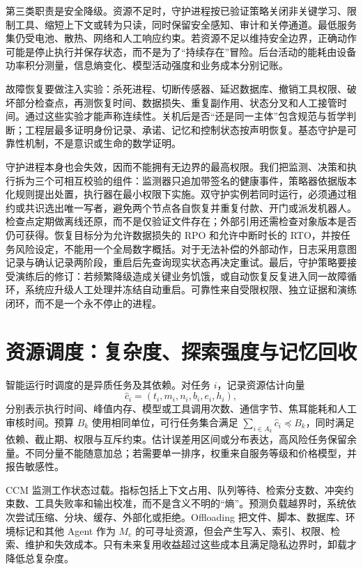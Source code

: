 第三类职责是安全降级。资源不足时，守护进程按已验证策略关闭非关键学习、限制工具、缩短上下文或转为只读，同时保留安全感知、审计和关停通道。最低服务集仍受电池、散热、网络和人工响应约束。若资源不足以维持安全边界，正确动作可能是停止执行并保存状态，而不是为了“持续存在”冒险。后台活动的能耗由设备功率积分测量，信息熵变化、模型活动强度和业务成本分别记账。

故障恢复要做注入实验：杀死进程、切断传感器、延迟数据库、撤销工具权限、破坏部分检查点，再测恢复时间、数据损失、重复副作用、状态分叉和人工接管时间。通过这些实验才能声称连续性。关机后是否“还是同一主体”包含规范与哲学判断；工程层最多证明身份记录、承诺、记忆和控制状态按声明恢复。基态守护是可靠性机制，不是意识或生命的数学证明。

守护进程本身也会失效，因而不能拥有无边界的最高权限。我们把监测、决策和执行拆为三个可相互校验的组件：监测器只追加带签名的健康事件，策略器依据版本化规则提出处置，执行器在最小权限下实施。双守护实例若同时运行，必须通过租约或共识选出唯一写者，避免两个节点各自恢复并重复付款、开门或派发机器人。检查点定期做离线还原，而不是仅验证文件存在；外部引用还需检查对象版本是否仍可获得。恢复目标分为允许数据损失的 RPO 和允许中断时长的 RTO，并按任务风险设定，不能用一个全局数字概括。对于无法补偿的外部动作，日志采用意图记录与确认记录两阶段，重启后先查询现实状态再决定重试。最后，守护策略要接受演练后的修订：若频繁降级造成关键业务饥饿，或自动恢复反复进入同一故障循环，系统应升级人工处理并冻结自动重启。可靠性来自受限权限、独立证据和演练闭环，而不是一个永不停止的进程。

\section{资源调度：复杂度、探索强度与记忆回收}
\label{sec:section_2043}

智能运行时调度的是异质任务及其依赖。对任务 $i$，记录资源估计向量
\[
\widehat c_i=(t_i,m_i,n_i,b_i,e_i,h_i),
\]
分别表示执行时间、峰值内存、模型或工具调用次数、通信字节、焦耳能耗和人工审核时间。预算 $B_k$ 使用相同单位，可行任务集合满足 $\sum_{i\in A_k}\widehat c_i\preceq B_k$，同时满足依赖、截止期、权限与互斥约束。估计误差用区间或分布表达，高风险任务保留余量。不同分量不能随意加总；若需要单一排序，权重来自服务等级和价格模型，并报告敏感性。

CCM 监测工作状态过载。指标包括上下文占用、队列等待、检索分支数、冲突约束数、工具失败率和输出校准，而不是含义不明的“熵”。预测负载越界时，系统依次尝试压缩、分块、缓存、外部化或拒绝。Offloading 把文件、脚本、数据库、环境标记和其他 Agent 作为 $M_e$ 的可寻址资源，但会产生写入、索引、权限、检索、维护和失效成本。只有未来复用收益超过这些成本且满足隐私边界时，卸载才降低总复杂度。

